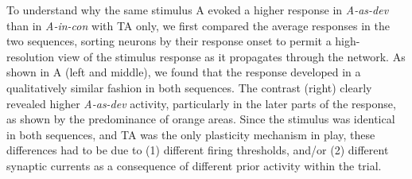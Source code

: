 \documentclass[9pt,lineno,onehalfspacing]{elife}
\newcommand{\dev}{\textit{A-as-dev}}
\newcommand{\msc}{\textit{A-in-con}}
\begin{document}
To understand why the same stimulus A evoked a higher response in \dev{} than in \msc{} with TA only, we first compared the average responses in the two sequences, sorting neurons by their response onset to permit a high-resolution view of the stimulus response as it propagates through the network. As shown in A (left and middle), we found that the response developed in a qualitatively similar fashion in both sequences. The contrast (right) clearly revealed higher \dev{} activity, particularly in the later parts of the response, as shown by the predominance of orange areas. Since the stimulus was identical in both sequences, and TA was the only plasticity mechanism in play, these differences had to be due to (1) different firing thresholds, and/or (2) different synaptic currents as a consequence of different prior activity within the trial.
\end{document}
